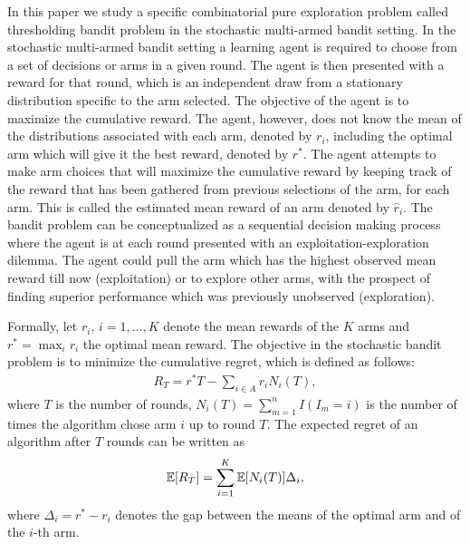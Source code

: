 In this paper we study a specific combinatorial pure exploration problem called thresholding bandit problem in the stochastic multi-armed bandit setting. In the stochastic multi-armed bandit setting a learning agent is required to choose from a set of decisions or arms in a given round. The agent is then presented with a reward for that round, which is an independent draw from a stationary distribution specific to the arm selected. The objective of the agent is to maximize the cumulative reward. The agent, however, does not know the mean of the distributions associated with each arm, denoted by $r_{i}$, including the optimal arm which will give it the best reward, denoted by $r^{*}$. The agent attempts to make arm choices that will maximize the cumulative reward by keeping track of the reward that has been gathered from previous selections of the arm, for each arm. This is called the estimated mean reward of an arm denoted by $\hat{r}_{i}$. The bandit problem can be conceptualized as a sequential decision making process where the agent is at each round presented with an exploitation-exploration dilemma. The agent could pull the arm which has the highest observed mean reward till now (exploitation) or to explore other arms, with the prospect of finding superior performance which was previously unobserved (exploration). 

	Formally, let $r_i$, $i=1,\ldots,K$ denote the mean rewards of the $K$ arms and $r^* = \max_i r_i$ the optimal mean reward. The objective in the stochastic bandit problem is to minimize the cumulative regret, which is defined as follows:
\begin{align*}
R_{T}=r^{*}T - \sum_{i\in A} r_{i}N_{i}(T),
\end{align*}
where $T$ is the number of rounds, $N_{i}(T)=\sum_{m=1}^n I(I_m=i)$ is the number of times the algorithm chose arm $i$ up to round $T$.
The expected regret of an algorithm after $T$ rounds can be written as
\begin{align*}
\mathbb{E}[R_{T}]= \sum_{i=1}^K \mathbb{E}[N_i(T)] \Delta_i,
\end{align*}
where $\Delta_{i}=r^{*}-r_{i}$ denotes the gap between the means of the optimal arm and of the $i$-th arm. 

